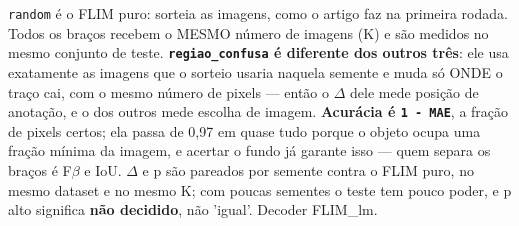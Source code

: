 \footnotesize \texttt{random} é o FLIM puro: sorteia as imagens, como o artigo faz na primeira rodada. Todos os braços recebem o MESMO número de imagens (K) e são medidos no mesmo conjunto de teste. \textbf{\texttt{regiao\_confusa} é diferente dos outros três}: ele usa exatamente as imagens que o sorteio usaria naquela semente e muda só ONDE o traço cai, com o mesmo número de pixels --- então o $\Delta$ dele mede posição de anotação, e o dos outros mede escolha de imagem. \textbf{Acurácia é \texttt{1 - MAE}}, a fração de pixels certos; ela passa de 0,97 em quase tudo porque o objeto ocupa uma fração mínima da imagem, e acertar o fundo já garante isso --- quem separa os braços é F$\beta$ e IoU. $\Delta$ e p são pareados por semente contra o FLIM puro, no mesmo dataset e no mesmo K; com poucas sementes o teste tem pouco poder, e p alto significa \textbf{não decidido}, não 'igual'. Decoder FLIM\_lm.
\normalsize
